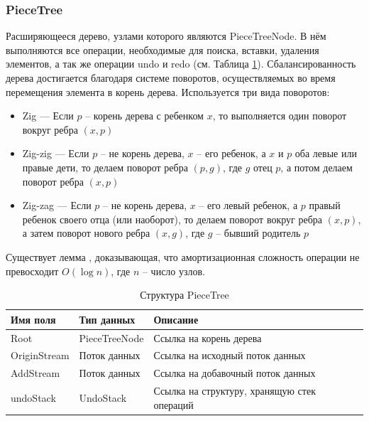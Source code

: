 \documentclass{fefu}
\begin{document}
			\subsubsection{PieceTree}
				\par Расширяющееся дерево, узлами которого являются
				PieceTreeNode. В нём выполняются все операции, необходимые для поиска,
				вставки, удаления элементов, а так же операции undo и redo (см. Таблица 
				\ref{table:PieceTree}). Сбалансированность дерева достигается благодаря системе
				поворотов, осуществляемых во время перемещения элемента в корень дерева. 
				Используется три вида поворотов:
				\begin{itemize}
					\item Zig --- Если $p$ -- корень дерева с ребенком $x$, то выполняется один
					поворот вокруг ребра $(x, p)$
					\item Zig-zig --- Если $p$ -- не корень дерева, $x$ -- его ребенок, а $x$ и 
					$p$ оба левые или правые дети, то делаем поворот ребра $(p, g)$, где $g$ 
					отец $p$, а потом делаем поворот ребра $(x, p)$
					\item Zig-zag --- Если $p$ -- не корень дерева, $x$ -- его левый 
					ребенок, а $p$ правый ребенок своего отца (или наоборот), то делаем
					поворот вокруг ребра $(x, p)$, а затем поворот нового ребра $(x, g)$, где 
					$g$ -- бывший родитель $p$
				\end{itemize}
				\par Существует лемма \cite{SplayTreeArticle}, доказывающая, что 
				амортизационная сложность операции не превосходит $O(\log{n})$, где $n$ -- 
				число узлов.
				\begin{table}[H]
					\centering
					\begin{tabular}{|l|l|p{10cm}|}
						\hline
						\textbf{Имя поля} & \textbf{Тип данных} & \textbf{Описание} \\
						\hline
						Root & PieceTreeNode & Ссылка на корень дерева \\
						\hline
						OriginStream & Поток данных & Ссылка на исходный поток данных \\
						\hline
						AddStream & Поток данных & Ссылка на добавочный поток данных \\
						\hline
						undoStack & UndoStack & Ссылка на структуру, хранящую стек операций \\
						\hline
					\end{tabular}
					\caption{Структура PieceTree}
					\label{table:PieceTree}
				\end{table}
\end{document}
